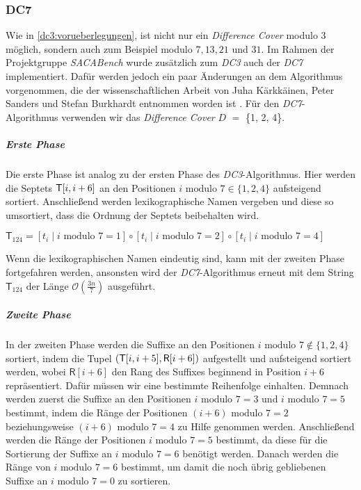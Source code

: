 \subsubsection{DC7}
\label{dc7}

Wie in \cref{dc3:vorueberlegungen}, ist nicht nur ein \emph{Difference Cover} modulo $3$ möglich, sondern auch zum Beispiel modulo $7, 13, 21$ und $31$. Im Rahmen der Projektgruppe \emph{SACABench} wurde zusätzlich zum \emph{DC3} auch der \emph{DC7} implementiert. Dafür werden jedoch ein paar Änderungen an dem Algorithmus vorgenommen, die der wissenschaftlichen Arbeit von Juha Kärkkäinen, Peter Sanders und Stefan Burkhardt entnommen worden ist \cite{dc3:new}. Für den \emph{DC7}-Algorithmus verwenden wir das \emph{Difference Cover} \(D\) $=$ \{1, 2, 4\}.

\subparagraph*{Erste Phase}

Die erste Phase ist analog zu der ersten Phase des \emph{DC3}-Algorithmus. Hier werden die Septets $\inputtext[i,i+6]$ an den Positionen $i \text{ modulo } 7 \in \{1, 2, 4\}$ aufsteigend sortiert. Anschließend werden lexikographische Namen vergeben und diese so umsortiert, dass die Ordnung der Septets beibehalten wird.
\begin{center}
	$\mathsf{T}_{124} = [t_i \mid i \text{ modulo } 7 = 1] \circ [t_i \mid i \text{ modulo } 7 = 2] \circ [t_i \mid i \text{ modulo } 7 = 4]$ 
\end{center}
Wenn die lexikographischen Namen eindeutig sind, kann mit der zweiten Phase fortgefahren werden, ansonsten wird der \emph{DC7}-Algorithmus erneut mit dem String $\mathsf{T}_{124}$ der Länge $\mathcal{O}(\frac{3n}{7})$ ausgeführt.

\subparagraph*{Zweite Phase}

In der zweiten Phase werden die Suffixe an den Positionen $i \text{ modulo } 7 \notin \{1, 2, 4\}$ sortiert, indem die Tupel $(\inputtext[i, i+5], \mathsf{R}[i+6])$ aufgestellt und aufsteigend sortiert werden, wobei $\mathsf{R}[i+6]$ den Rang des Suffixes beginnend in Position $i + 6$ repräsentiert. Dafür müssen wir eine bestimmte Reihenfolge einhalten. Demnach werden zuerst die Suffixe an den Positionen $i \text{ modulo } 7 = 3$ und $i \text{ modulo } 7 = 5$ bestimmt, indem die Ränge der Positionen $(i+6) \text{ modulo } 7 = 2$ beziehungsweise $(i+6) \text{ modulo } 7 = 4$ zu Hilfe genommen werden. Anschließend werden die Ränge der Positionen $i \text{ modulo } 7 = 5$ bestimmt, da diese für die Sortierung der Suffixe an $i \text{ modulo } 7 = 6$ benötigt werden. Danach werden die Ränge von $i \text{ modulo } 7 = 6$ bestimmt, um damit die noch übrig gebliebenen Suffixe an $i \text{ modulo } 7 = 0$ zu sortieren.


